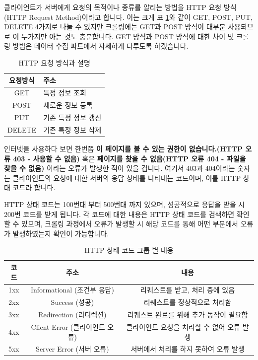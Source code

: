 \documentclass[12pt,]{book}
\begin{document}
클라이언트가 서버에게 요청의 목적이나 종류를 알리는 방법을 HTTP 요청 방식(HTTP Request Method)이라고 합니다. 이는 크게 표 \ref{tab:http}와 같이 GET, POST, PUT, DELETE 4가지로 나눌 수 있지만 크롤링에는 GET과 POST 방식이 대부분 사용되므로 이 두가지만 아는 것도 충분합니다. GET 방식과 POST 방식에 대한 차이 및 크롤링 방법은 데이터 수집 파트에서 자세하게 다루도록 하겠습니다.

\begin{table}[!h]

\caption{\label{tab:http}HTTP 요청 방식과 설명}
\centering
\begin{tabular}{c>{\centering\arraybackslash}p{5cm}}
\toprule
요청방식 & 주소\\
\midrule
\rowcolor{gray!6}  GET & 특정 정보 조회\\
POST & 새로운 정보 등록\\
\rowcolor{gray!6}  PUT & 기존 특정 정보 갱신\\
DELETE & 기존 특정 정보 삭제\\
\bottomrule
\end{tabular}
\end{table}

인터넷을 사용하다 보면 한번쯤 \textbf{이 페이지를 볼 수 있는 권한이 없습니다.(HTTP 오류 403 - 사용할 수 없음)} 혹은 \textbf{페이지를 찾을 수 없음(HTTP 오류 404 - 파일을 찾을 수 없음)} 이라는 오류가 발생한 적이 있을 겁니다. 여기서 403과 404이라는 숫자는 클라이언트의 요청에 대한 서버의 응답 상태를 나타내는 코드이며, 이를 HTTP 상태 코드라 합니다.

HTTP 상태 코드는 100번대 부터 500번대 까지 있으며, 성공적으로 응답을 받을 시 200번 코드를 받게 됩니다. 각 코드에 대한 내용은 HTTP 상태 코드를 검색하면 확인할 수 있으며, 크롤링 과정에서 오류가 발생할 시 해당 코드를 통해 어떤 부분에서 오류가 발생하였는지 확인이 가능합니다.

\begin{table}[!h]

\caption{\label{tab:unnamed-chunk-5}HTTP 상태 코드 그룹 별 내용}
\centering
\fontsize{8}{10}\selectfont
\begin{tabular}{ccc}
\toprule
코드 & 주소 & 내용\\
\midrule
\rowcolor{gray!6}  1xx & Informational (조건부 응답) & 리퀘스트를 받고, 처리 중에 있음\\
2xx & Success (성공) & 리퀘스트를 정상적으로 처리함\\
\rowcolor{gray!6}  3xx & Redirection (리디렉션) & 리퀘스트 완료를 위해 추가 동작이 필요함\\
4xx & Client Error (클라이언트 오류) & 클라이언트 요청을 처리할 수 없어 오류 발생\\
\rowcolor{gray!6}  5xx & Server Error (서버 오류) & 서버에서 처리를 하지 못하여 오류 발생\\
\bottomrule
\end{tabular}
\end{table}
\end{document}
